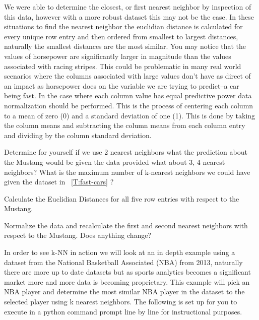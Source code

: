 We were able to determine the closest, or first nearest neighbor by
inspection of this data, however with a more robust dataset this may
not be the case. In these situations to find the nearest neighbor the
euclidian distance is calculated for every unique row entry and then
ordered from smallest to largest distances, naturally the smallest
distances are the most similar. You may notice that the values of
horsepower are significantly larger in magnitude than the values
associated with racing stripes. This could be problematic in many real
world scenarios where the columns associated with large values don't
have as direct of an impact as horsepower does on the variable we are
trying to predict--a car being fast. In the case where
each column value has equal predictive power data normalization should
be performed. This is the process of centering each column to a mean
of zero (0) and a standard deviation of one (1). This is done by taking the column
means and subtracting the column means from each column entry and
dividing by the column standard deviation. 

\begin{exercise} Determine for yourself if we use 2 nearest neighbors what the
prediction about the Mustang would be given the data provided what
about 3, 4  nearest neighbors? What is the maximum number of k-nearest
neighbors we could have given the dataset in ~\ref{T:fast-cars} ?
\end{exercise}

\begin{exercise} Calculate the Euclidian Distances for all five row
  entries with respect to the Mustang.
\end{exercise}

\begin{exercise} Normalize the data and recalculate the first and
  second nearest neighbors with respect to the Mustang. Does anything
  change? 
\end{exercise}

 

In order to see k-NN in action we will look at an in depth example using
a dataset from the National Basketball Associated (NBA) from 2013,
naturally there are more up to date datasets but as sports analytics
becomes a significant market more and more data is becoming
proprietary. This example will pick an NBA player and determine the
most similar NBA player in the dataset to the selected player using
k nearest neighbors. The following is set up for you to execute in a
python command prompt line by line for instructional purposes.  

